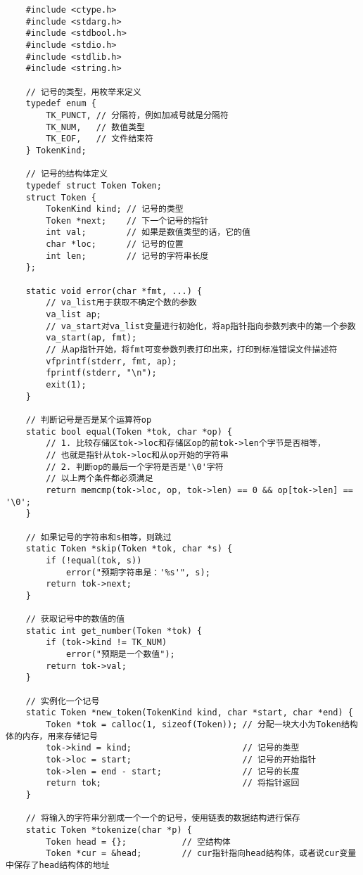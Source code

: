 \documentclass[cn,10pt,math=newtx,citestyle=gb7714-2015,bibstyle=gb7714-2015]{elegantbook}
\begin{document}
\begin{verbatim}
    #include <ctype.h>
    #include <stdarg.h>
    #include <stdbool.h>
    #include <stdio.h>
    #include <stdlib.h>
    #include <string.h>

    // 记号的类型，用枚举来定义
    typedef enum {
        TK_PUNCT, // 分隔符，例如加减号就是分隔符
        TK_NUM,   // 数值类型
        TK_EOF,   // 文件结束符
    } TokenKind;

    // 记号的结构体定义
    typedef struct Token Token;
    struct Token {
        TokenKind kind; // 记号的类型
        Token *next;    // 下一个记号的指针
        int val;        // 如果是数值类型的话，它的值
        char *loc;      // 记号的位置
        int len;        // 记号的字符串长度
    };

    static void error(char *fmt, ...) {
        // va_list用于获取不确定个数的参数
        va_list ap;
        // va_start对va_list变量进行初始化，将ap指针指向参数列表中的第一个参数
        va_start(ap, fmt);
        // 从ap指针开始，将fmt可变参数列表打印出来，打印到标准错误文件描述符
        vfprintf(stderr, fmt, ap);
        fprintf(stderr, "\n");
        exit(1);
    }

    // 判断记号是否是某个运算符op
    static bool equal(Token *tok, char *op) {
        // 1. 比较存储区tok->loc和存储区op的前tok->len个字节是否相等，
        // 也就是指针从tok->loc和从op开始的字符串
        // 2. 判断op的最后一个字符是否是'\0'字符
        // 以上两个条件都必须满足
        return memcmp(tok->loc, op, tok->len) == 0 && op[tok->len] == '\0';
    }

    // 如果记号的字符串和s相等，则跳过
    static Token *skip(Token *tok, char *s) {
        if (!equal(tok, s))
            error("预期字符串是：'%s'", s);
        return tok->next;
    }

    // 获取记号中的数值的值
    static int get_number(Token *tok) {
        if (tok->kind != TK_NUM)
            error("预期是一个数值");
        return tok->val;
    }

    // 实例化一个记号
    static Token *new_token(TokenKind kind, char *start, char *end) {
        Token *tok = calloc(1, sizeof(Token)); // 分配一块大小为Token结构体的内存，用来存储记号
        tok->kind = kind;                      // 记号的类型
        tok->loc = start;                      // 记号的开始指针
        tok->len = end - start;                // 记号的长度
        return tok;                            // 将指针返回
    }

    // 将输入的字符串分割成一个一个的记号，使用链表的数据结构进行保存
    static Token *tokenize(char *p) {
        Token head = {};           // 空结构体
        Token *cur = &head;        // cur指针指向head结构体，或者说cur变量中保存了head结构体的地址


\end{verbatim}
\end{document}
